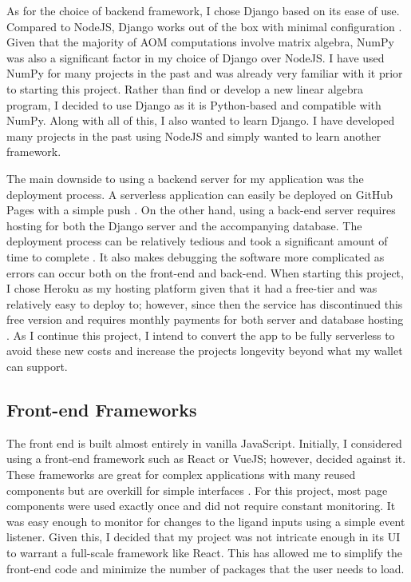 \documentclass[10pt,twocolumn]{article}
\begin{document}
As for the choice of backend framework, I chose Django based on its ease of use. Compared to NodeJS, Django works out of the box with minimal configuration \cite{django}. Given that the majority of AOM computations involve matrix algebra, NumPy was also a significant factor in my choice of Django over NodeJS. I have used NumPy for many projects in the past and was already very familiar with it prior to starting this project. Rather than find or develop a new linear algebra program, I decided to use Django as it is Python-based and compatible with NumPy. Along with all of this, I also wanted to learn Django. I have developed many projects in the past using NodeJS and simply wanted to learn another framework.
 
The main downside to using a backend server for my application was the deployment process. A serverless application can easily be deployed on GitHub Pages with a simple push \cite{githubpages}. On the other hand, using a back-end server requires hosting for both the Django server and the accompanying database. The deployment process can be relatively tedious and took a significant amount of time to complete \cite{deploying_django}. It also makes debugging the software more complicated as errors can occur both on the front-end and back-end. When starting this project, I chose Heroku as my hosting platform given that it had a free-tier and was relatively easy to deploy to; however, since then the service has discontinued this free version and requires monthly payments for both server and database hosting \cite{heroku_removal_of_free_tier}. As I continue this project, I intend to convert the app to be fully serverless to avoid these new costs and increase the projects longevity beyond what my wallet can support.

\subsection{Front-end Frameworks}
The front end is built almost entirely in vanilla JavaScript. Initially, I considered using a front-end framework such as React or VueJS; however, decided against it. These frameworks are great for complex applications with many reused components but are overkill for simple interfaces \cite{react}. For this project, most page components were used exactly once and did not require constant monitoring. It was easy enough to monitor for changes to the ligand inputs using a simple event listener. Given this, I decided that my project was not intricate enough in its UI to warrant a full-scale framework like React. This has allowed me to simplify the front-end code and minimize the number of packages that the user needs to load. 
\end{document}
